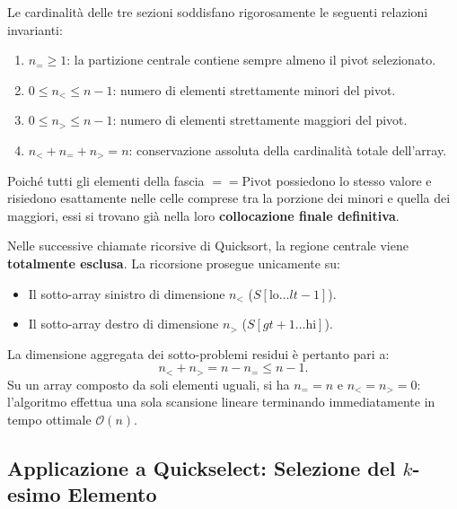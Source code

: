 \begin{property}
\label{prop:3way-dimensional-invariants}
Le cardinalità delle tre sezioni soddisfano rigorosamente le seguenti relazioni invarianti:
\begin{enumerate}
  \item $n_= \ge 1$: la partizione centrale contiene sempre almeno il pivot selezionato.
  \item $0 \le n_< \le n - 1$: numero di elementi strettamente minori del pivot.
  \item $0 \le n_> \le n - 1$: numero di elementi strettamente maggiori del pivot.
  \item $n_< + n_= + n_> = n$: conservazione assoluta della cardinalità totale dell'array.
\end{enumerate}
\end{property}

\begin{theorem}
\label{thm:central-region-exclusion}
Poiché tutti gli elementi della fascia $== \text{Pivot}$ possiedono lo stesso valore e risiedono esattamente nelle celle comprese tra la porzione dei minori e quella dei maggiori, essi si trovano già nella loro \textbf{collocazione finale definitiva}. 

Nelle successive chiamate ricorsive di Quicksort, la regione centrale viene \textbf{totalmente esclusa}. La ricorsione prosegue unicamente su:
\begin{itemize}
  \item Il sotto-array sinistro di dimensione $n_<$ ($S[\text{lo} \dots lt-1]$).
  \item Il sotto-array destro di dimensione $n_>$ ($S[gt+1 \dots \text{hi}]$).
\end{itemize}
La dimensione aggregata dei sotto-problemi residui è pertanto pari a:
\begin{equation}
  n_< + n_> = n - n_= \le n - 1.
\end{equation}
Su un array composto da soli elementi uguali, si ha $n_= = n$ e $n_< = n_> = 0$: l'algoritmo effettua una sola scansione lineare terminando immediatamente in tempo ottimale $\mathcal{O}(n)$.
\end{theorem}

\subsection{Applicazione a Quickselect: Selezione del \texorpdfstring{$k$}{k}-esimo Elemento}
\label{subsec:3way-quickselect}

